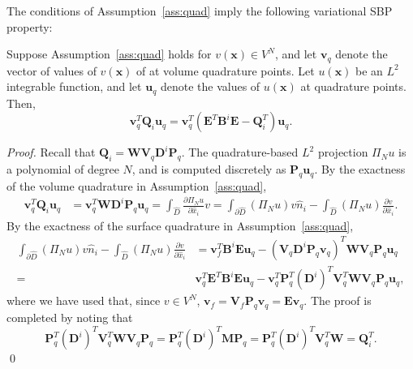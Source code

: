 \documentclass{svjour3}                     %
\renewcommand{\hat}{\widehat}
\newcommand{\pd}[2]{\frac{\partial#1}{\partial#2}}
\newcommand{\LRp}[1]{\left( #1 \right)}
\begin{document}
The conditions of Assumption~\ref{ass:quad} imply the following variational SBP property:
\begin{lemma}
\label{lemma:vsbp}
Suppose Assumption~\ref{ass:quad} holds for $v(\bm{x})\in V^N$, and let $\bm{v}_q$ denote the vector of values of $v(\bm{x})$ of at volume quadrature points. Let $u(\bm{x})$ be an $L^2$ integrable function, and let $\bm{u}_q$ denote the values of $u(\bm{x})$ at quadrature points.  Then, 
\[
\bm{v}_q^T\bm{Q}_i \bm{u}_q = \bm{v}_q^T\LRp{ {\bm{E}}^T \bm{B}^i\bm{E} - \bm{Q}_i^T}\bm{u}_q.
\]
\end{lemma}
\begin{proof}
Recall that $\bm{Q}_i = \bm{W} \bm{V}_q \bm{D}^i\bm{P}_q$.  The quadrature-based $L^2$ projection $\Pi_Nu$ is a polynomial of degree $N$, and is computed discretely as $\bm{P}_q\bm{u}_q$.  By the exactness of the volume quadrature in Assumption~\ref{ass:quad}, 
\begin{align*}
\bm{v}_q^T\bm{Q}_i \bm{u}_q &= \bm{v}_q^T\bm{W} \bm{D}^i \bm{P}_q \bm{u}_q = \int_{\hat{D}} \pd{\Pi_N u}{\hat{x}_i} v = \int_{\partial \hat{D}} (\Pi_N u) v \hat{n}_i - \int_{\hat{D}} \LRp{\Pi_N u} \pd{v}{\hat{x}_i}.
\end{align*}
By the exactness of the surface quadrature in Assumption~\ref{ass:quad}, 
\begin{align*}
\int_{\partial \hat{D}} (\Pi_N u) v \hat{n}_i -   \int_{\hat{D}} \LRp{\Pi_N u} \pd{v}{\hat{x}_i} &=\bm{v}_f^T\bm{B}^i \bm{E}\bm{u}_q - \LRp{\bm{V}_q\bm{D}^i\bm{P}_q\bm{v}_q}^T\bm{W} \bm{V}_q\bm{P}_q\bm{u}_q\\
=& \bm{v}_q^T {\bm{E}}^T\bm{B}^i \bm{E}\bm{u}_q - \bm{v}_q^T \bm{P}_q^T\LRp{\bm{D}^i}^T \bm{V}_q^T \bm{W} \bm{V}_q\bm{P}_q\bm{u}_q,
\end{align*}
where we have used that, since $v \in V^N$, $\bm{v}_f = \bm{V}_f\bm{P}_q\bm{v}_q = \bm{E}\bm{v}_q$.  The proof is completed by noting that 
\[
\bm{P}_q^T\LRp{\bm{D}^i}^T \bm{V}_q^T \bm{W} \bm{V}_q\bm{P}_q = \bm{P}_q^T\LRp{\bm{D}^i}^T \bm{M}\bm{P}_q = \bm{P}_q^T\LRp{\bm{D}^i}^T \bm{V}_q^T\bm{W} = \bm{Q}_i^T.
\]
\qed\end{proof}
\end{document}
